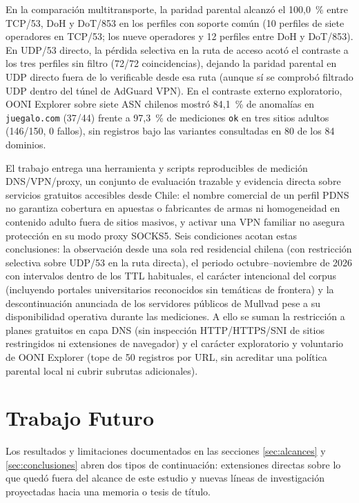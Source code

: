 \documentclass[10pt,a4paper]{article}
\begin{document}
En la comparación multitransporte, la paridad parental alcanzó el 100,0~\% entre TCP/53, DoH y DoT/853 en los perfiles con soporte común (10 perfiles de siete operadores en TCP/53; los nueve operadores y 12 perfiles entre DoH y DoT/853). En UDP/53 directo, la pérdida selectiva en la ruta de acceso acotó el contraste a los tres perfiles sin filtro (72/72 coincidencias), dejando la paridad parental en UDP directo fuera de lo verificable desde esa ruta (aunque sí se comprobó filtrado UDP dentro del túnel de AdGuard VPN). En el contraste externo exploratorio, OONI Explorer \cite{ooni2012,ooni} sobre siete ASN chilenos mostró 84,1~\% de anomalías en \texttt{juegalo.com} (37/44) frente a 97,3~\% de mediciones \texttt{ok} en tres sitios adultos (146/150, 0 fallos), sin registros bajo las variantes consultadas en 80 de los 84 dominios.

El trabajo entrega una herramienta y scripts reproducibles de medición DNS/VPN/proxy, un conjunto de evaluación trazable y evidencia directa sobre servicios gratuitos accesibles desde Chile: el nombre comercial de un perfil PDNS no garantiza cobertura en apuestas o fabricantes de armas ni homogeneidad en contenido adulto fuera de sitios masivos, y activar una VPN familiar no asegura protección en su modo proxy SOCKS5. Seis condiciones acotan estas conclusiones: la observación desde una sola red residencial chilena (con restricción selectiva sobre UDP/53 en la ruta directa), el periodo octubre--noviembre de 2026 con intervalos dentro de los TTL habituales, el carácter intencional del corpus (incluyendo portales universitarios reconocidos sin temáticas de frontera) y la descontinuación anunciada de los servidores públicos de Mullvad pese a su disponibilidad operativa durante las mediciones. A ello se suman la restricción a planes gratuitos en capa DNS (sin inspección HTTP/HTTPS/SNI de sitios restringidos ni extensiones de navegador) y el carácter exploratorio y voluntario de OONI Explorer (tope de 50 registros por URL, sin acreditar una política parental local ni cubrir subrutas adicionales).

\section{Trabajo Futuro}\label{sec:futuro}

Los resultados y limitaciones documentados en las secciones \ref{sec:alcances} y \ref{sec:conclusiones} abren dos tipos de continuación: extensiones directas sobre lo que quedó fuera del alcance de este estudio y nuevas líneas de investigación proyectadas hacia una memoria o tesis de título.
\end{document}
